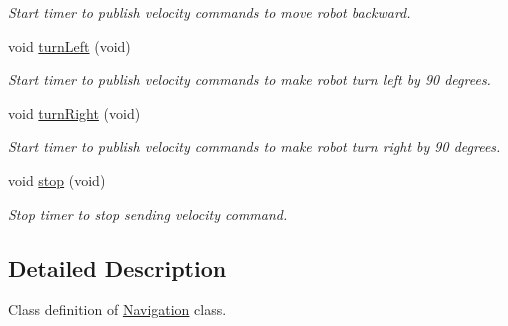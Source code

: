 \begin{DoxyCompactItemize}
\begin{DoxyCompactList}\small\item\em Start timer to publish velocity commands to move robot backward. \end{DoxyCompactList}\item 
void \hyperlink{classNavigation_ab0f6a2a6c5835df96c242182026d43b8}{turn\-Left} (void)
\begin{DoxyCompactList}\small\item\em Start timer to publish velocity commands to make robot turn left by 90 degrees. \end{DoxyCompactList}\item 
void \hyperlink{classNavigation_a8ed07aa7844ee0b7cb2724531666725e}{turn\-Right} (void)
\begin{DoxyCompactList}\small\item\em Start timer to publish velocity commands to make robot turn right by 90 degrees. \end{DoxyCompactList}\item 
void \hyperlink{classNavigation_acf42139316bfa03b2750effa63f6bcd0}{stop} (void)
\begin{DoxyCompactList}\small\item\em Stop timer to stop sending velocity command. \end{DoxyCompactList}\end{DoxyCompactItemize}


\subsection{Detailed Description}
Class definition of \hyperlink{classNavigation}{Navigation} class. 

